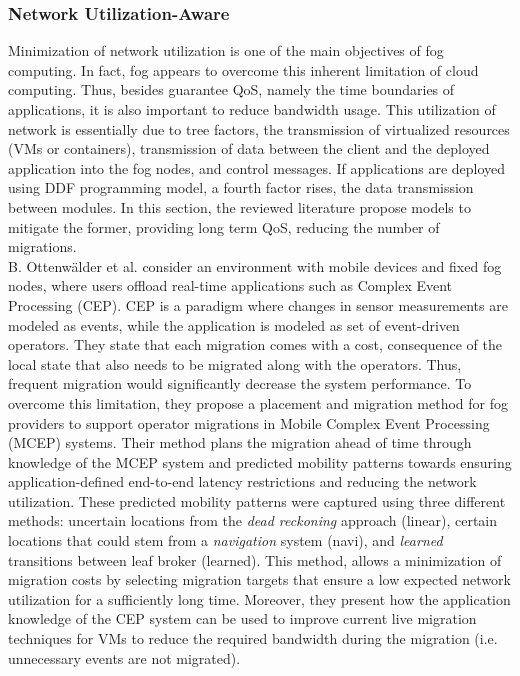 \subsubsection{Network Utilization-Aware}\label{NetworkUtilizationAware}
\noindent Minimization of network utilization is one of the main objectives of fog computing. In fact, fog appears to overcome this inherent limitation of cloud computing. Thus, besides guarantee QoS, namely the time boundaries of applications, it is also  important to reduce bandwidth usage. This utilization of network is essentially due to tree factors, the transmission of virtualized resources (VMs or containers), transmission of data between the client and the deployed application into the fog nodes, and control messages. If applications are deployed using DDF programming model, a fourth factor rises, the data transmission between modules. In this section, the reviewed literature propose models to mitigate the former, providing long term QoS, reducing the number of migrations.\\
\noindent\tab B. Ottenwälder et al. \cite{ottenwalder2013migcep} consider an environment with mobile devices and fixed fog nodes, where users offload real-time applications such as Complex Event Processing (CEP). CEP is a paradigm where changes in sensor measurements are modeled as events, while the application is modeled as set of event-driven operators. They state that each migration comes with a cost, consequence of the local state that also needs to be migrated along with the operators. Thus, frequent migration would significantly decrease the system performance. To overcome this limitation, they propose a placement and migration method for fog providers to support operator migrations in Mobile Complex Event Processing (MCEP) systems. Their method plans the migration ahead of time through knowledge of the MCEP system and predicted mobility patterns towards ensuring application-defined end-to-end latency restrictions and reducing the network utilization. These predicted mobility patterns were captured using three different methods: uncertain locations from the \textit{dead reckoning} approach (linear), certain locations that could stem from a \textit{navigation} system (navi), and \textit{learned} transitions between leaf broker (learned). This method, allows a minimization of migration costs by selecting migration targets that ensure a low expected network utilization for a sufficiently long time. Moreover, they present how the application knowledge of the CEP system can be used to improve current live migration techniques for VMs to reduce the required bandwidth during the migration (i.e. unnecessary events are not migrated). \\
